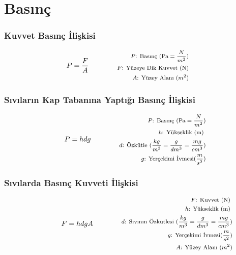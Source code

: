 \section{Basınç}

\subsubsection*{Kuvvet Basınç İlişkisi}
\begin{equation}
    P = \frac{F}{A} \qquad \qquad \parbox{4cm}{\footnotesize$\begin{aligned}
        P\text{: Basınç (Pa} = \frac{N}{m^2}\text{)} \\
        F\text{: Yüzeye Dik Kuvvet (N)} \\
        A\text{: Yüzey Alanı } (m^2)
\end{aligned}$}
\end{equation}

\subsubsection*{Sıvıların Kap Tabanına Yaptığı Basınç İlişkisi}
\begin{equation}
    P = hdg \qquad \qquad \parbox{4cm}{\footnotesize$\begin{aligned}
        P\text{: Basınç (Pa} = \frac{N}{m^2}\text{)} \\
        h\text{: Yükseklik (m) } \\
        d\text{: Özkütle } (\frac{kg}{m^3} = \frac{g}{dm^3} = \frac{mg}{cm^3})  \\
        g\text{: Yerçekimi İvmesi} (\frac{m}{s^2})
\end{aligned}$}
\end{equation}

\subsubsection*{Sıvılarda Basınç Kuvveti İlişkisi}
\begin{equation}
    F = hdgA \qquad \qquad \parbox{4cm}{\footnotesize$\begin{aligned}
        F\text{: Kuvvet (N) } \\
        h\text{: Yükseklik (m) } \\
        d\text{: Sıvının Özkütlesi } (\frac{kg}{m^3} = \frac{g}{dm^3} = \frac{mg}{cm^3})  \\
        g\text{: Yerçekimi İvmesi} (\frac{m}{s^2}) \\
        A\text{: Yüzey Alanı } (m^2)
\end{aligned}$}
\end{equation}
